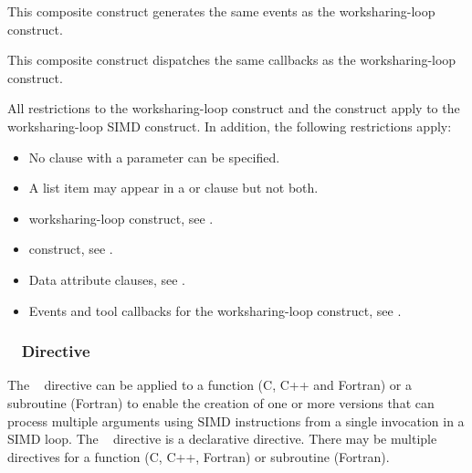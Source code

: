 \events

This composite construct generates the same events as the worksharing-loop construct.

\tools

This composite construct dispatches the same callbacks as the worksharing-loop construct.

\restrictions
All restrictions to the worksharing-loop construct and the  construct apply to
the worksharing-loop SIMD construct. In addition, the following restrictions apply:

\begin{itemize}
\item No  clause with a parameter can be specified.
\item A list item may appear in a  or  clause but not both.
\end{itemize}

\begin{samepage}
\crossreferences
\begin{itemize}
\item worksharing-loop construct, see
.

\item {} construct, see
.

\item Data attribute clauses, see
.

\item Events and tool callbacks for the worksharing-loop construct, see
.
\end{itemize}
\end{samepage}


\subsubsection{~ Directive}
\label{subsubsec:declare simd Directive}
\summary
The ~ directive can be applied to a function (C, C++ and Fortran) or a
subroutine (Fortran) to enable the creation of one or more versions that can process
multiple arguments using SIMD instructions from a single invocation in a SIMD
loop. The ~ directive is a declarative directive. There may be multiple
~ directives for a function (C, C++, Fortran) or subroutine (Fortran).

